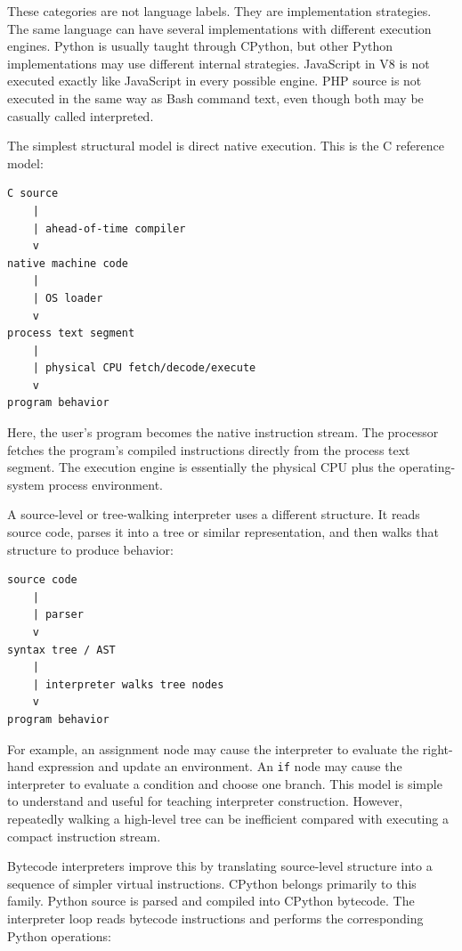 \documentclass[a4paper,twoside]{report}
\begin{document}
These categories are not language labels. They are implementation strategies. The same language can have several implementations with different execution engines. Python is usually taught through CPython, but other Python implementations may use different internal strategies. JavaScript in V8 is not executed exactly like JavaScript in every possible engine. PHP source is not executed in the same way as Bash command text, even though both may be casually called interpreted.

The simplest structural model is direct native execution. This is the C reference model:

\begin{verbatim}
C source
    |
    | ahead-of-time compiler
    v
native machine code
    |
    | OS loader
    v
process text segment
    |
    | physical CPU fetch/decode/execute
    v
program behavior
\end{verbatim}

Here, the user's program becomes the native instruction stream. The processor fetches the program's compiled instructions directly from the process text segment. The execution engine is essentially the physical CPU plus the operating-system process environment.

A source-level or tree-walking interpreter uses a different structure. It reads source code, parses it into a tree or similar representation, and then walks that structure to produce behavior:

\begin{verbatim}
source code
    |
    | parser
    v
syntax tree / AST
    |
    | interpreter walks tree nodes
    v
program behavior
\end{verbatim}

For example, an assignment node may cause the interpreter to evaluate the right-hand expression and update an environment. An \texttt{if} node may cause the interpreter to evaluate a condition and choose one branch. This model is simple to understand and useful for teaching interpreter construction. However, repeatedly walking a high-level tree can be inefficient compared with executing a compact instruction stream.

Bytecode interpreters improve this by translating source-level structure into a sequence of simpler virtual instructions. CPython belongs primarily to this family. Python source is parsed and compiled into CPython bytecode. The interpreter loop reads bytecode instructions and performs the corresponding Python operations:
\end{document}
